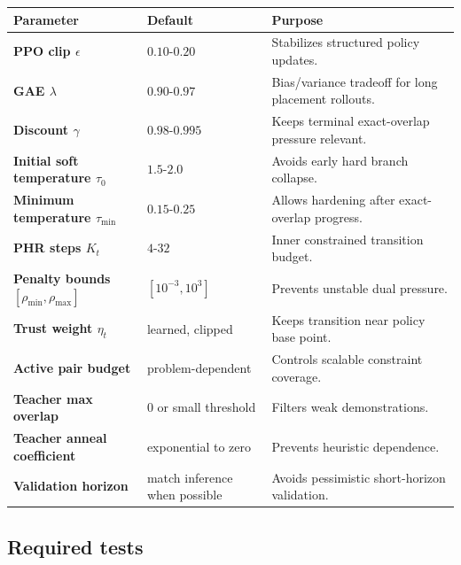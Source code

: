 \documentclass[11pt]{article}
\begin{document}
\begin{center}
\small
\begin{tabularx}{\textwidth}{>{\bfseries\color{navy}}p{}p{}Y}
\toprule
Parameter & Default & Purpose \\
\midrule
PPO clip $\epsilon$ & $0.10$-$0.20$ & Stabilizes structured policy updates. \\
GAE $\lambda$ & $0.90$-$0.97$ & Bias/variance tradeoff for long placement rollouts. \\
Discount $\gamma$ & $0.98$-$0.995$ & Keeps terminal exact-overlap pressure relevant. \\
Initial soft temperature $\tau_0$ & $1.5$-$2.0$ & Avoids early hard branch collapse. \\
Minimum temperature $\tau_{\min}$ & $0.15$-$0.25$ & Allows hardening after exact-overlap progress. \\
PHR steps $K_t$ & $4$-$32$ & Inner constrained transition budget. \\
Penalty bounds $[\rho_{\min},\rho_{\max}]$ & $[10^{-3},10^3]$ & Prevents unstable dual pressure. \\
Trust weight $\eta_t$ & learned, clipped & Keeps transition near policy base point. \\
Active pair budget & problem-dependent & Controls scalable constraint coverage. \\
Teacher max overlap & $0$ or small threshold & Filters weak demonstrations. \\
Teacher anneal coefficient & exponential to zero & Prevents heuristic dependence. \\
Validation horizon & match inference when possible & Avoids pessimistic short-horizon validation. \\
\bottomrule
\end{tabularx}
\end{center}

\subsection{Required tests}
\end{document}

